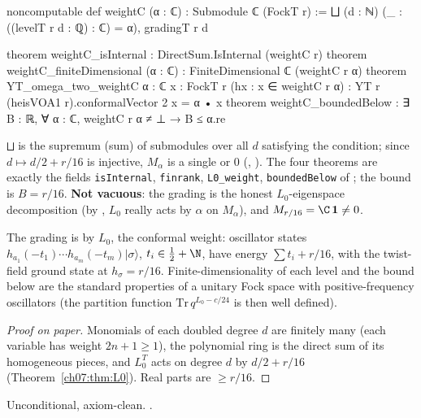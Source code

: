 \begin{leancode}
noncomputable def weightC (α : ℂ) : Submodule ℂ (FockT r) :=
  ⨆ (d : ℕ) (_ : ((levelT r d : ℚ) : ℂ) = α), gradingT r d

theorem weightC_isInternal : DirectSum.IsInternal (weightC r)
theorem weightC_finiteDimensional (α : ℂ) : FiniteDimensional ℂ (weightC r α)
theorem YT_omega_two_weightC {α : ℂ} {x : FockT r} (hx : x ∈ weightC r α) :
    YT r (heisVOA1 r).conformalVector 2 x = α • x
theorem weightC_boundedBelow :
    ∃ B : ℝ, ∀ α : ℂ, weightC r α ≠ ⊥ → B ≤ α.re
\end{leancode}

\begin{dictionary}
\verb|⨆| is the supremum (sum) of submodules over all $d$ satisfying the condition; since
$d\mapsto d/2+r/16$ is injective, $M_\alpha$ is a single  or $0$
(, ). The four theorems are exactly the fields
\verb|isInternal|, \verb|finrank|, \verb|L0_weight|, \verb|boundedBelow| of
; the bound is $B = r/16$. \textbf{Not vacuous}: the grading is the honest
$L_0$-eigenspace decomposition (by , $L_0$ really acts by $\alpha$ on
$M_\alpha$), and $M_{r/16} = \C\,\mathbf 1\ne0$.
\end{dictionary}

\begin{physics}
The grading is by $L_0$, the conformal weight: oscillator states $h_{a_1}(-t_1)\cdots h_{a_m}(-t_m)|\sigma\rangle$, $t_i\in\tfrac12+\N$, have energy $\sum t_i+r/16$, with the twist-field ground state at $h_\sigma=r/16$. Finite-dimensionality of each level and the bound below are the standard properties of a unitary Fock space with positive-frequency oscillators (the partition function $\mathrm{Tr}\,q^{L_0-c/24}$ is then well defined).
\end{physics}

\begin{proof}[Proof on paper]
Monomials of each doubled degree $d$ are finitely many (each variable has weight $2n+1\ge1$), the
polynomial ring is the direct sum of its homogeneous pieces, and $L_0^T$ acts on degree $d$ by
$d/2+r/16$ (Theorem~\ref{ch07:thm:L0}). Real parts are $\ge r/16$.
\end{proof}

\begin{status}
Unconditional, axiom-clean. .
\end{status}

